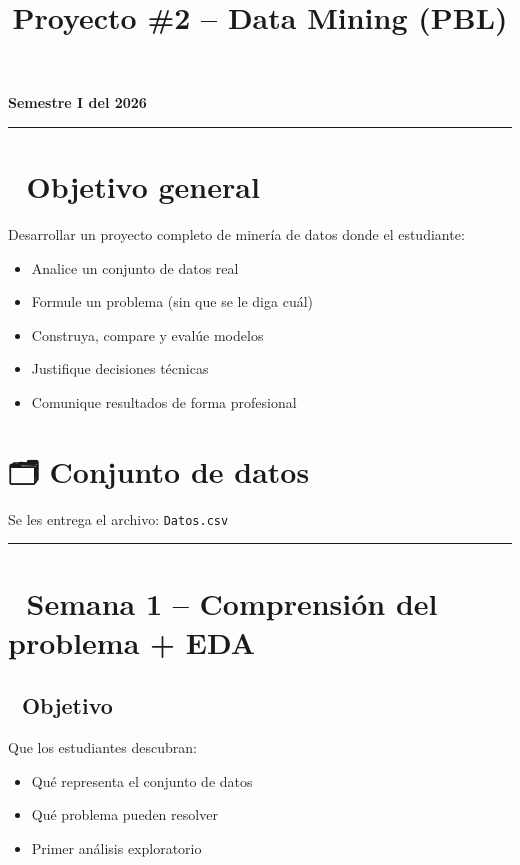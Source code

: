 \documentclass[11pt,a4paper]{article}
\title{\textbf{Proyecto \#2 -- Data Mining (PBL)}}
\author{}
\date{}
\begin{document}
\maketitle

\begin{center}
\Large \textbf{Semestre I del 2026}
\end{center}

\hrule
\vspace{1cm}

\section*{🎯 Objetivo general}

Desarrollar un proyecto completo de minería de datos donde el estudiante:

\begin{itemize}[leftmargin=1.5cm]
\item Analice un conjunto de datos real
\item Formule un problema (sin que se le diga cuál)
\item Construya, compare y evalúe modelos
\item Justifique decisiones técnicas
\item Comunique resultados de forma profesional
\end{itemize}

\section*{🗂️ Conjunto de datos}

Se les entrega el archivo: \texttt{Datos.csv}

\hrule
\vspace{0.8cm}

\section*{📅 Semana 1 -- Comprensión del problema + EDA}

\subsection*{🎯 Objetivo}

Que los estudiantes descubran:

\begin{itemize}[leftmargin=1.5cm]
\item Qué representa el conjunto de datos
\item Qué problema pueden resolver
\item Primer análisis exploratorio
\end{itemize}
\end{document}
